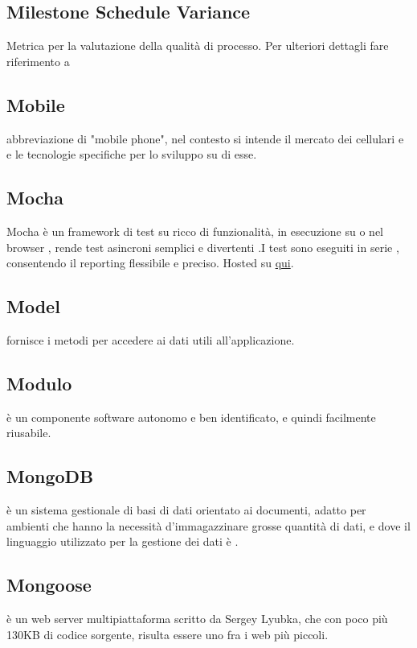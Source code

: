 \documentclass[12pt,a4paper]{article}
\begin{document}
\subsection{Milestone Schedule Variance}
 Metrica per la valutazione della qualità di processo. Per ulteriori dettagli fare riferimento a \PdQ{}

\subsection{Mobile} 
abbreviazione di "mobile phone", nel contesto si intende il mercato dei cellulari e  e le tecnologie specifiche per lo sviluppo su di esse.

\subsection{Mocha} 
 Mocha è un framework di test su  ricco di funzionalità, in esecuzione su  o nel browser , rende test asincroni semplici  e divertenti .I test sono eseguiti in serie , consentendo il reporting flessibile e preciso. Hosted su 
\href{https://github.com/mochajs/mocha}{qui}.

\subsection{Model} 
 fornisce i metodi per accedere ai dati utili all'applicazione.

\subsection{Modulo} 
 è un componente software autonomo e ben identificato, e quindi facilmente riusabile.

\subsection{MongoDB} 
 è un sistema gestionale di basi di dati  orientato ai documenti, adatto per ambienti che hanno la necessità d'immagazzinare grosse quantità di dati, e dove il linguaggio utilizzato per la gestione dei dati è .

\subsection{Mongoose} 
 è un web server multipiattaforma scritto da Sergey Lyubka, che con poco più 130KB di codice sorgente, risulta essere uno fra i  web più piccoli.
\end{document}
